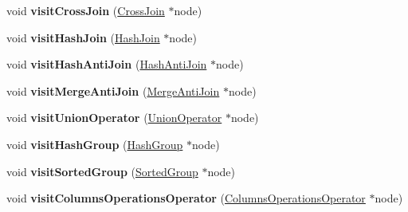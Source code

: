 \begin{DoxyCompactItemize}
\item 
\hypertarget{class_cloning_physical_operator_visitor_aa48e6141645ce53d8cae2b1678fdc2d4}{void {\bfseries visit\+Cross\+Join} (\hyperlink{class_cross_join}{Cross\+Join} $\ast$node)}\label{class_cloning_physical_operator_visitor_aa48e6141645ce53d8cae2b1678fdc2d4}

\item 
\hypertarget{class_cloning_physical_operator_visitor_abb1f8426172480eb5968abd7f9deb541}{void {\bfseries visit\+Hash\+Join} (\hyperlink{class_hash_join}{Hash\+Join} $\ast$node)}\label{class_cloning_physical_operator_visitor_abb1f8426172480eb5968abd7f9deb541}

\item 
\hypertarget{class_cloning_physical_operator_visitor_a661c04bfbdf0d36e745fc82bf8f8a193}{void {\bfseries visit\+Hash\+Anti\+Join} (\hyperlink{class_hash_anti_join}{Hash\+Anti\+Join} $\ast$node)}\label{class_cloning_physical_operator_visitor_a661c04bfbdf0d36e745fc82bf8f8a193}

\item 
\hypertarget{class_cloning_physical_operator_visitor_af32410ddcbf200eb102bbe8ad5ad1859}{void {\bfseries visit\+Merge\+Anti\+Join} (\hyperlink{class_merge_anti_join}{Merge\+Anti\+Join} $\ast$node)}\label{class_cloning_physical_operator_visitor_af32410ddcbf200eb102bbe8ad5ad1859}

\item 
\hypertarget{class_cloning_physical_operator_visitor_af9199524feba8c12ceff7d78c1915064}{void {\bfseries visit\+Union\+Operator} (\hyperlink{class_union_operator}{Union\+Operator} $\ast$node)}\label{class_cloning_physical_operator_visitor_af9199524feba8c12ceff7d78c1915064}

\item 
\hypertarget{class_cloning_physical_operator_visitor_aa3a6b9d8327700089089e57e18861d6d}{void {\bfseries visit\+Hash\+Group} (\hyperlink{class_hash_group}{Hash\+Group} $\ast$node)}\label{class_cloning_physical_operator_visitor_aa3a6b9d8327700089089e57e18861d6d}

\item 
\hypertarget{class_cloning_physical_operator_visitor_a464894a18b7194c57e0c8d16f901ff5b}{void {\bfseries visit\+Sorted\+Group} (\hyperlink{class_sorted_group}{Sorted\+Group} $\ast$node)}\label{class_cloning_physical_operator_visitor_a464894a18b7194c57e0c8d16f901ff5b}

\item 
\hypertarget{class_cloning_physical_operator_visitor_ad818258fa87a049e49d255107f655819}{void {\bfseries visit\+Columns\+Operations\+Operator} (\hyperlink{class_columns_operations_operator}{Columns\+Operations\+Operator} $\ast$node)}\label{class_cloning_physical_operator_visitor_ad818258fa87a049e49d255107f655819}


\end{DoxyCompactItemize}
